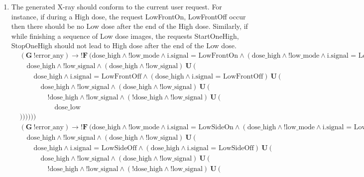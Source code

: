 \documentclass[a4paper,10pt]{article}
\newcommand{\LTLG}{\mathbf{G~}}
\newcommand{\LTLF}{\mathbf{F~}}
\newcommand{\LTLU}{\mathbf{~U~}}
\newcommand{\imply}{\rightarrow}
\newcommand{\doselow}{\textrm{dose\_low}}
\newcommand{\dosehigh}{\textrm{dose\_high}}
\newcommand{\lowsignal}{\textrm{low\_signal}}
\newcommand{\errorany}{\textrm{error\_any}}
\newcommand{\lowmode}{\textrm{low\_mode}}
\begin{document}
\begin{enumerate}
		\item The generated X-ray should conform to the current user request. For instance, if during a High dose, the request LowFrontOn, LowFrontOff occur then there should be no Low dose after the end of the High dose. Similarly, if while finishing a sequence of Low dose images, the requests StartOneHigh, StopOneHigh should not lead to High dose after the end of the Low dose.
			\begin{align*}
				&(\LTLG !\errorany) \imply !\LTLF (\dosehigh \land !\lowmode \land \textrm{i.signal = LowFrontOn} \land (\dosehigh \land !\lowmode \land \textrm{i.signal = LowFrontOn}) \LTLU ( \\
				&	\hspace{1em}\dosehigh \land !\lowsignal \land (\dosehigh \land !\lowsignal) \LTLU ( \\
				&		\hspace{2em}\dosehigh \land \textrm{i.signal = LowFrontOff} \land (\dosehigh \land \textrm{i.signal = LowFrontOff}) \LTLU ( \\
				&			\hspace{3em}\dosehigh \land !\lowsignal \land (\dosehigh \land !\lowsignal) \LTLU ( \\
				&				\hspace{4em}!\dosehigh \land !\lowsignal \land (!\dosehigh \land !\lowsignal) \LTLU ( \\
				&					\hspace{5em}\doselow \\
				&))))))
			\end{align*}
			\begin{align*}
				&(\LTLG !\errorany) \imply !\LTLF (\dosehigh \land !\lowmode \land \textrm{i.signal = LowSideOn} \land (\dosehigh \land !\lowmode \land \textrm{i.signal = LowSideOn}) \LTLU ( \\
				&	\hspace{1em}\dosehigh \land !\lowsignal \land (\dosehigh \land !\lowsignal) \LTLU ( \\
				&		\hspace{2em}\dosehigh \land \textrm{i.signal = LowSideOff} \land (\dosehigh \land \textrm{i.signal = LowSideOff}) \LTLU ( \\
				&			\hspace{3em}\dosehigh \land !\lowsignal \land (\dosehigh \land !\lowsignal) \LTLU ( \\
				&				\hspace{4em}!\dosehigh \land !\lowsignal \land (!\dosehigh \land !\lowsignal) \LTLU ( \\

\end{align*}
\end{enumerate}
\end{document}
